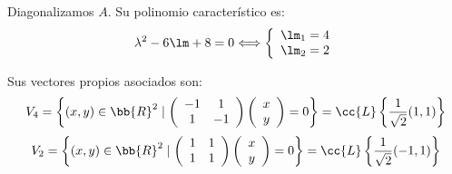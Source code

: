 \begin{ejercicio}
\begin{enumerate}
        Diagonalizamos $A$. Su polinomio característico es:
        \begin{equation*}
            \lambda^2 -6\lm +8 = 0 \Longleftrightarrow \left\{\begin{array}{l}
                \lm_1 = 4\\
                \lm_2 = 2
            \end{array}\right.
        \end{equation*}

        Sus vectores propios asociados son:
        \begin{equation*}
            V_{4} = \left\{(x,y)\in \bb{R}^2 \mid \left(\begin{array}{cc}
                -1 & 1 \\
                1 & -1\\ 
            \end{array}\right)\left(\begin{array}{c}
                x\\y
            \end{array}\right)=0 \right\} = \cc{L}\left\{\frac{1}{\sqrt{2}}(1,1)\right\}
        \end{equation*}
        \begin{equation*}
            V_{2} = \left\{(x,y)\in \bb{R}^2 \mid \left(\begin{array}{cc}
                1 & 1\\
                1 & 1
            \end{array}\right)\left(\begin{array}{c}
                x\\y
            \end{array}\right)=0 \right\} = \cc{L}\left\{\frac{1}{\sqrt{2}}(-1,1)\right\}
        \end{equation*}


\end{enumerate}
\end{ejercicio}
